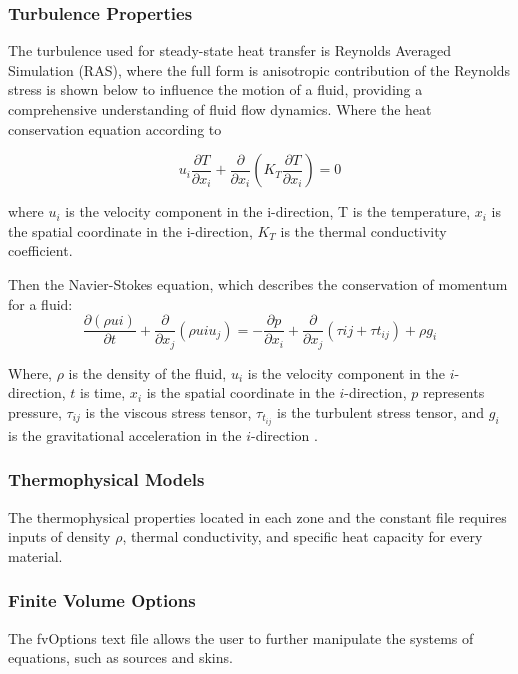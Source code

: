 \subsubsection{Turbulence Properties}
The turbulence used for steady-state heat transfer is Reynolds Averaged Simulation (RAS), where the full form is anisotropic contribution of the Reynolds stress is shown below to influence the motion of a fluid, providing a comprehensive understanding of fluid flow dynamics. Where the heat conservation equation according to \cite{hce}

\begin{equation}
u_i \frac{\partial T}{\partial x_i} + \frac{\partial}{\partial x_i}(K_T \frac{\partial T}{\partial x_i}) = 0 \label{eq:heat}
\end{equation}

where $u_i$ is the velocity component in the i-direction, T is the temperature, $x_i$ is the spatial coordinate in the i-direction, $K_T$ is the thermal conductivity coefficient.


Then the Navier-Stokes equation, which describes the conservation of momentum for a fluid:
\begin{equation}
\frac{\partial (\rho {u}i)}{\partial t} + \frac{\partial}{\partial x_j} \left( \rho {u}i u_j \right) = -\frac{\partial p}{\partial x_i} + \frac{\partial}{\partial x_j} \left( \tau{ij} + \tau{t_{ij}} \right) + \rho g_i
\end{equation}



Where, $\rho$ is the density of the fluid, $u_i$ is the velocity component in the $i$-direction, $t$ is time, $x_i$ is the spatial coordinate in the $i$-direction, $p$ represents pressure, $\tau_{ij}$ is the viscous stress tensor, $\tau_{t_{ij}}$ is the turbulent stress tensor, and $g_i$ is the gravitational acceleration in the $i$-direction
 \cite{cht}.


\subsubsection{Thermophysical Models}
The thermophysical properties located in each zone and the constant file requires inputs of density $\rho$, thermal conductivity, and specific heat capacity for every material.
\subsubsection{Finite Volume Options}
The fvOptions text file allows the user to further manipulate the systems of equations, such as sources and skins. 


